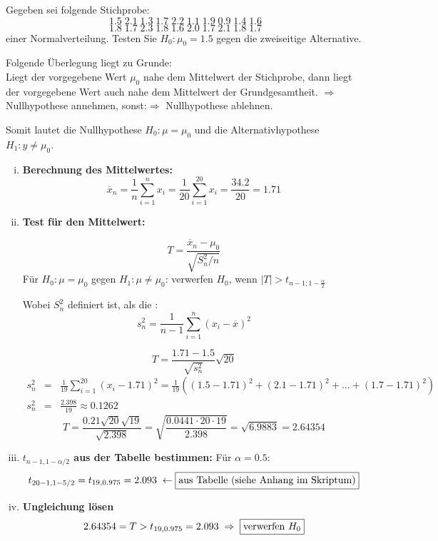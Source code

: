 \begin{uebsp}
\begin{Exercise}[label=ex:9.2]
Gegeben sei folgende Stichprobe:
\[1.5\;2.1\;1.3\;1.7\;2.2\;1.1\;1.9\;0.9\;1.4\;1.6\]
\[1.8\;1.7\;2.3\;1.8\;1.6\;2.0\;1.7\;2.1\;1.8\;1.7\]
einer Normalverteilung. Testen Sie $H_0:\mu_0=1.5$ gegen die zweiseitige Alternative.
\end{Exercise}
\begin{Answer}
\begin{uebsp_theory}
Folgende Überlegung liegt zu Grunde:\\
Liegt der vorgegebene Wert $\mu_0$ nahe dem Mittelwert der Stichprobe, dann liegt der vorgegebene Wert auch nahe dem Mittelwert der Grundgesamtheit.
$\Rightarrow$ Nullhypothese annehmen, sonst:$\Rightarrow$ Nullhypothese ablehnen.
\end{uebsp_theory}
Somit lautet die Nullhypothese $H_0:\mu=\mu_0$ und die Alternativhypothese $H_1:y\neq \mu_0$.
\begin{enumerate}[i)]
\item \textbf{Berechnung des Mittelwertes:}
\[\overline x_n=\frac{1}{n}\sum_{i=1}^nx_i=\frac{1}{20}\sum_{i=1}^{20}x_i=\frac{34.2}{20}=1.71\]
\item \textbf{Test für den Mittelwert:}
\begin{uebsp_theory}
\[T=\frac{\overline x_n-\mu_0}{\sqrt{S_n^2/n}}\]
Für $H_0:\mu =\mu_0$ gegen $H_1:\mu\neq\mu_0$:
    verwerfen $H_0$, wenn $|T|>t_{n-1;1-\frac{\alpha}{2}}$

Wobei $S_n^2$ definiert ist, als die :
\[s_n^2=\frac{1}{n-1}\sum_{i=1}^n(x_i-\overline x)^2\]
\end{uebsp_theory}
\[T=\frac{1.71-1.5}{\sqrt{s_n^2}}\sqrt{20}\]
\begin{eqnarray*}
s_n^2&=&\frac{1}{19}\sum_{i=1}^{20}(x_i-1.71)^2=\frac{1}{19}((1.5-1.71)^2+(2.1-1.71)^2+...+(1.7-1.71)^2)\\
s_n^2&=&\frac{2.398}{19}\approx0.1262
\end{eqnarray*}
\[T=\frac{0.21\sqrt{20}\sqrt{19}}{\sqrt{2.398}}=\sqrt{\frac{0.0441\cdot 20\cdot 19}{2.398}}=\sqrt{6.9883}=2.64354\]
\item \textbf{$t_{n-1,1-\alpha/2}$ aus der Tabelle bestimmen:}
Für  $\alpha=0.5$:
\[t_{20-1,1-5/2}=t_{19,0.975}=2.093\;\leftarrow\framebox{aus \reference{Tabelle}{Anhang}{sec:quantile_t_verteilung}}\]
\item \textbf{Ungleichung lösen}
\[2.64354=T>t_{19,0.975}=2.093\;\Rightarrow\;\framebox{verwerfen $H_0$}\]
\end{enumerate}
\end{Answer}
\end{uebsp}
